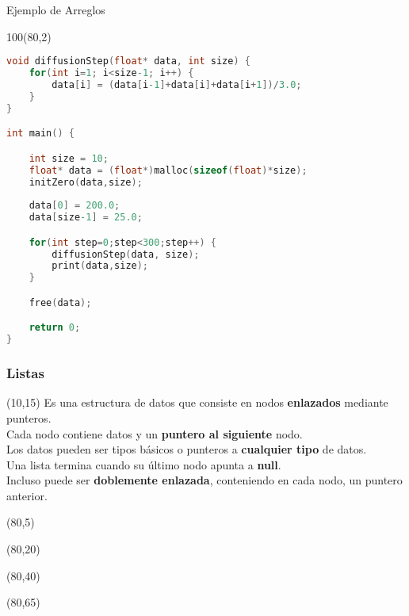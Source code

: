 \documentclass[aspectratio=169]{beamer}
\begin{document}
\begin{frame}[fragile]{Ejemplo de Arreglos}
    \begin{textblock}{100}(80,2)
    \scriptsize
    \begin{lstlisting}[language=C,basicstyle=\ttfamily,columns=fullflexible]
void diffusionStep(float* data, int size) {
    for(int i=1; i<size-1; i++) {
        data[i] = (data[i-1]+data[i]+data[i+1])/3.0;
    }
}

int main() {

    int size = 10;
    float* data = (float*)malloc(sizeof(float)*size);
    initZero(data,size);
    
    data[0] = 200.0;
    data[size-1] = 25.0;

    for(int step=0;step<300;step++) {
        diffusionStep(data, size);
        print(data,size);
    }

    free(data);

    return 0;
}
    \end{lstlisting}
    \end{textblock}
\end{frame}

\begin{frame}[t]
    \frametitle{Listas}
    \begin{textblock}{65}(10,15)
    Es una estructura de datos que consiste en nodos \textbf{enlazados} mediante punteros.\\
    \bigskip
    Cada nodo contiene datos y un \textbf{puntero al siguiente} nodo.\\
    \bigskip
    Los datos pueden ser tipos básicos o punteros a \textbf{cualquier tipo} de datos.\\
    \bigskip
    Una lista termina cuando su último nodo apunta a \textbf{null}.\\
    \bigskip
    Incluso puede ser \textbf{doblemente enlazada}, conteniendo en cada nodo, un puntero anterior.\\
    \end{textblock}
    \begin{textblock}{60}(80,5)  \end{textblock}
    \begin{textblock}{60}(80,20)  \end{textblock}
    \begin{textblock}{60}(80,40)  \end{textblock}
    \begin{textblock}{60}(80,65)  \end{textblock}
\end{frame}
\end{document}
